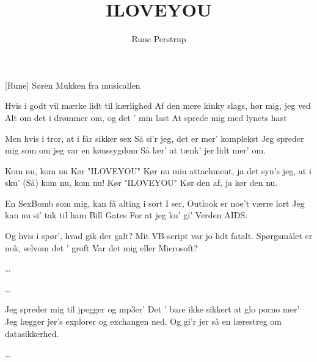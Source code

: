 \documentclass[danish]{article}
\title{ILOVEYOU}
\author{Rune Perstrup}
\begin{document}
\maketitle

\begin{roles}
  [Rune] Søren Mukken fra musicallen
\end{roles}

\begin{song}
 Hvis i godt vil mærke lidt til kærlighed
Af den mere kinky slags, hør mig, jeg ved
Alt om det i drømmer om, og det ' min last
At sprede mig med lynets hast

 Men hvis i tror, at i får sikker sex
Så si'r jeg, det er mer' komplekst
Jeg spreder mig som om jeg var en kønssygdom
Så lær' at tænk' jer lidt mer' om.

 Kom nu, kom nu
Kør "ILOVEYOU"
Kør nu min attachment, ja det syn's jeg, at i sku'
(Så) kom nu, kom nu!
Kør "ILOVEYOU"
Kør den af, ja kør den nu.

 En SexBomb som mig, kan få alting i sort
I ser, Outlook er noe't værre lort
Jeg kan nu si' tak til ham Bill Gates
For at jeg ku' gi' Verden AIDS.

 Og hvis i spør', hvad gik der galt?
Mit VB-script var jo lidt fatalt.
Spørgsmålet er nok, selvom det ' groft
Var det mig eller Microsoft?

 \ldots

 \ldots

 Jeg spreder mig til jpegger og mp3er'
Det ' bare ikke sikkert at glo porno mer'
Jeg lægger jer's explorer og exchangen ned.
Og gi'r jer så en lærestreg om datasikkerhed.

 

 \ldots

\end{song}
\end{document}
